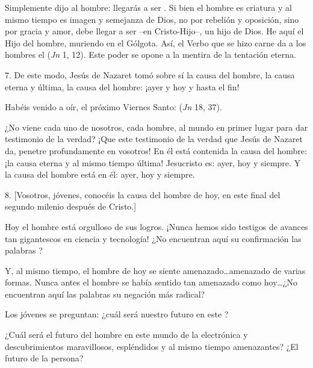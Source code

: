 \begin{body}
Simplemente dijo al hombre: llegarás a ser . Si bien el hombre es criatura y al mismo tiempo es imagen y semejanza de Dios, no por rebelión y oposición, sino por gracia y amor, debe llegar a ser –en Cristo-Hijo–, un hijo de Dios. He aquí el Hijo del hombre, muriendo en el Gólgota. Así, el Verbo que se hizo carne da a los hombres el  (\textit{Jn} 1, 12). Este poder se opone a la mentira de la tentación eterna.

7. De este modo, Jesús de Nazaret tomó sobre sí la causa del hombre, la causa eterna y última, la causa del hombre: ¡ayer y hoy y hasta el fin!

 Habéis venido a oír, el próximo Viernes Santo:  (\textit{Jn} 18, 37).

¿No viene cada uno de nosotros, cada hombre, al mundo en primer lugar para dar testimonio de la verdad? ¡Que este testimonio de la verdad que Jesús de Nazaret da, penetre profundamente en vosotros! En él está contenida la causa del hombre: ¡la causa eterna y al mismo tiempo última! Jesucristo es: ayer, hoy y siempre. Y la causa del hombre está en él: ayer, hoy y siempre.

8. {[Vosotros, jóvenes, conocéis la causa del hombre de hoy, en este final del segundo milenio después de Cristo.]}

Hoy el hombre está orgulloso de sus logros. ¡Nunca hemos sido testigos de avances tan gigantescos en ciencia y tecnología! ¿No encuentran aquí su confirmación las palabras ?

Y, al mismo tiempo, el hombre de hoy se siente amenazado\ldots amenazado de varias formas. Nunca antes el hombre se había sentido tan amenazado como hoy\ldots ¿No encuentran aquí las palabras  su negación más radical?

Los jóvenes se preguntan: ¿cuál será nuestro futuro en este ?

¿Cuál será el futuro del hombre en este mundo de la electrónica y descubrimientos maravillosos, espléndidos y al mismo tiempo amenazantes? ¿El futuro de la persona?


\end{body}
